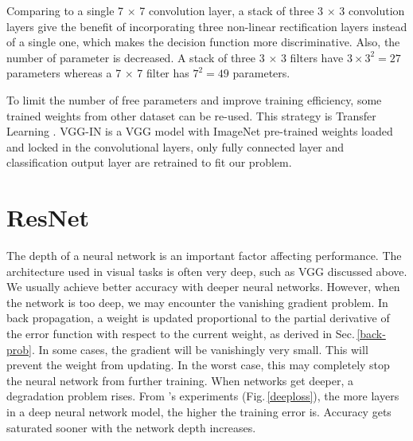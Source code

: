Comparing to a single 7 $\times$ 7 convolution layer, a stack of three 3 $\times$ 3 convolution layers give the benefit of incorporating three non-linear rectification layers instead of a single one, which makes the decision function more discriminative. Also, the number of parameter is decreased. A stack of three 3 $\times$ 3 filters have $3\times3^2 = 27$ parameters whereas a 7 $\times$ 7 filter has $7^2 = 49$ parameters. 

To limit the number of free parameters and improve training efficiency, some trained weights from other dataset can be re-used. This strategy is Transfer Learning \citep{transfer}. VGG-IN is a VGG model with ImageNet \citep{imagenet_cvpr09} pre-trained weights \citep{vgg} loaded and locked in the convolutional layers, only fully connected layer and classification output layer are retrained to fit our problem.

\section{ResNet}
\label{arch_resnet}

The depth of a neural network is an important factor affecting performance. The architecture used in visual tasks is often very deep, such as VGG discussed above. We usually achieve better accuracy with deeper neural networks. However, when the network is too deep, we may encounter the vanishing gradient problem. In back propagation, a weight is updated proportional to the partial derivative of the error function with respect to the current weight, as derived in Sec.\,\ref{back-prob}. In some cases, the gradient will be vanishingly very small. This will prevent the weight from updating. In the worst case, this may completely stop the neural network from further training. When networks get deeper, a degradation problem rises. From \citeauthor{Srivastava2015}'s experiments \cite{Srivastava2015} (Fig.\,\ref{deeploss}), the more layers in a deep neural network model, the higher the training error is. Accuracy gets saturated sooner with the network depth increases.

